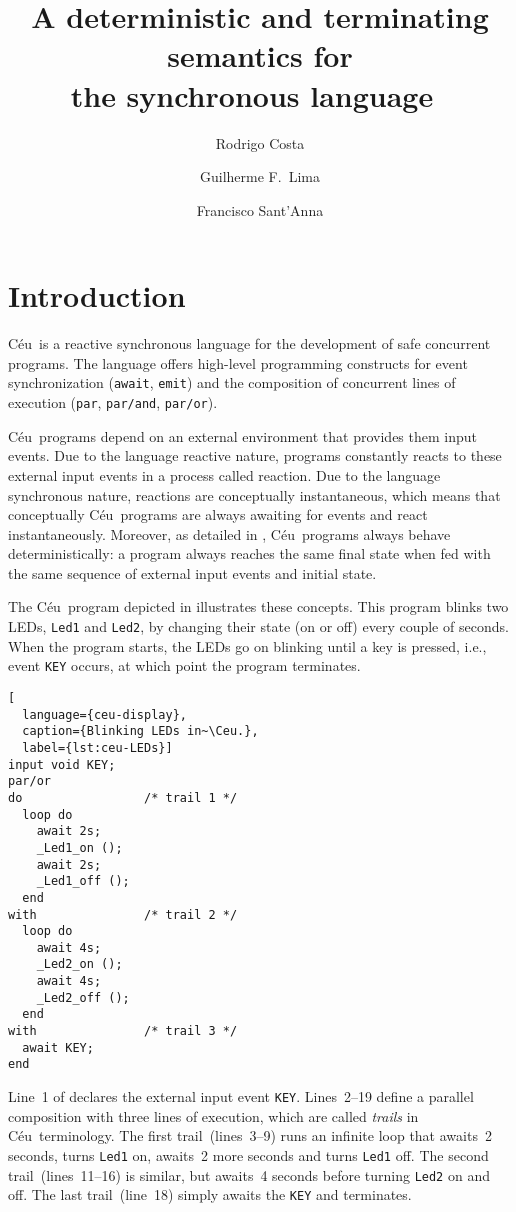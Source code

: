 \documentclass[10pt,a4paper,oneside,leqno]{article}
\title{A deterministic and terminating semantics for\\
  the synchronous language~\Ceu}
\author{Rodrigo Costa \and Guilherme F.~Lima \and Francisco Sant'Anna}
\numberwithin{equation}{section}
\def\Ceu{C\'eu}
\def\ceulst#1{\lstinline[language=ceu,basicstyle=\ttfamily]|#1|}
\begin{document}
\maketitle


\section{Introduction}
\label{sec:intro}

\Ceu\ is a reactive synchronous language for the development of safe
concurrent programs. The language offers high-level programming constructs
for event synchronization (\ceulst{await}, \ceulst{emit}) and the
composition of concurrent lines of execution (\ceulst{par},
\ceulst{par/and}, \ceulst{par/or}).

\Ceu\ programs depend on an external environment that provides them input
events.  Due to the language reactive nature, programs constantly reacts to
these external input events in a process called reaction.  Due to the
language synchronous nature, reactions are conceptually instantaneous, which
means that conceptually \Ceu\ programs are always awaiting for events and
react instantaneously.  Moreover, as detailed in , \Ceu\
programs always behave deterministically: a program always reaches the same
final state when fed with the same sequence of external input events and
initial state.

The \Ceu\ program depicted in  illustrates these
concepts.  This program blinks two LEDs, \ceulst{Led1} and \ceulst{Led2}, by
changing their state (on or off) every couple of seconds.  When the program
starts, the LEDs go on blinking until a key is pressed, i.e., event
\ceulst{KEY} occurs, at which point the program terminates.

\begin{lstlisting}[
  language={ceu-display},
  caption={Blinking LEDs in~\Ceu.},
  label={lst:ceu-LEDs}]
input void KEY;
par/or
do                 /* trail 1 */
  loop do
    await 2s;
    _Led1_on ();
    await 2s;
    _Led1_off ();
  end
with               /* trail 2 */
  loop do
    await 4s;
    _Led2_on ();
    await 4s;
    _Led2_off ();
  end
with               /* trail 3 */
  await KEY;
end
\end{lstlisting}

Line~1 of  declares the external input event \ceulst{KEY}.
Lines~2--19 define a parallel composition with three lines of execution,
which are called \emph{trails} in \Ceu\ terminology.  The first
trail~(lines~3--9) runs an infinite loop that awaits~2 seconds, turns
\ceulst{Led1} on, awaits~2 more seconds and turns \ceulst{Led1} off.  The
second trail~(lines~11--16) is similar, but awaits~4 seconds before turning
\ceulst{Led2} on and off.  The last trail~(line~18) simply awaits the
\ceulst{KEY} and terminates.
\end{document}
